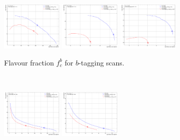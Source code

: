 \begin{figure}[h!]
  \centering
  \begin{subfigure}[b]{\textwidth}
      \centering
      \includegraphics[width=0.32\textwidth]{Images/FTAG/VRDL1d/scansfraction/thesis_plot_frac/contour_fraction_ttbar_200.pdf}
      \includegraphics[width=0.32\textwidth]{Images/FTAG/VRDL1d/scansfraction/thesis_plot_frac/contour_fraction_zpext_200.pdf}
      \includegraphics[width=0.32\textwidth]{Images/FTAG/VRDL1d/scansfraction/thesis_plot_frac/contour_fraction_graviton_200.pdf}
      \caption{Flavour fraction $f_c^b$ for $b$-tagging scans.} 
      \label{fig:DL1dVRscanfb}
  \end{subfigure}\\
  \begin{subfigure}[b]{\textwidth}
    \centering %
    \includegraphics[width=0.32\textwidth]{Images/FTAG/VRDL1d/scansfraction/thesis_plot_frac_c/contour_fraction_ttbar_2000.pdf}
    \includegraphics[width=0.32\textwidth]{Images/FTAG/VRDL1d/scansfraction/thesis_plot_frac_c/contour_fraction_zpext_2000.pdf}

\end{subfigure}
\end{figure}
